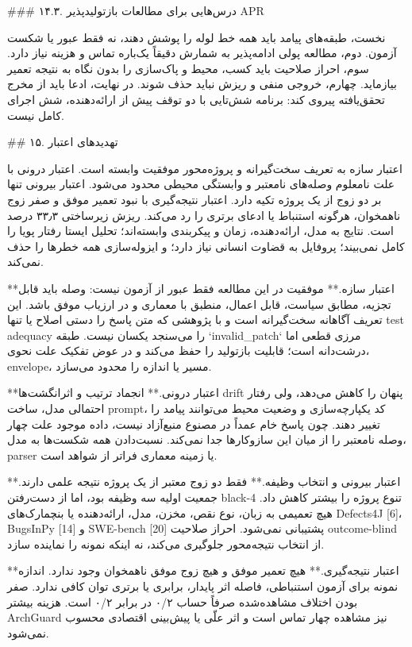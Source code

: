 \documentclass[11pt,a4paper]{article}
\begin{document}
\#\#\# ۱۴.۳. درس‌هایی برای مطالعات بازتولیدپذیر APR

نخست، طبقه‌های پیامد باید همه خط لوله را پوشش دهند، نه فقط عبور یا شکست آزمون. دوم، مطالعه پولی
ادامه‌پذیر به شمارش دقیقاً یک‌باره تماس و هزینه نیاز دارد. سوم، احراز صلاحیت باید کسب، محیط و پاک‌سازی
را بدون نگاه به نتیجه تعمیر بیازماید. چهارم، خروجی منفی و ریزش نباید حذف شوند. در نهایت، ادعا باید از
مخرج تحقق‌یافته پیروی کند: برنامه شش‌تایی با دو توقف پیش از ارائه‌دهنده، شش اجرای کامل نیست.

\#\# ۱۵. تهدیدهای اعتبار

اعتبار سازه به تعریف سخت‌گیرانه و پروژه‌محور موفقیت وابسته است. اعتبار درونی با علت نامعلوم وصله‌های
نامعتبر و وابستگی محیطی محدود می‌شود. اعتبار بیرونی تنها بر دو زوج از یک پروژه تکیه دارد. اعتبار
نتیجه‌گیری با نبود تعمیر موفق و صفر زوج ناهمخوان، هرگونه استنباط یا ادعای برتری را رد می‌کند. ریزش
زیرساختی ۳۳٫۳ درصد است. نتایج به مدل، ارائه‌دهنده، زمان و پیکربندی وابسته‌اند؛ تحلیل ایستا رفتار پویا
را کامل نمی‌بیند؛ پروفایل به قضاوت انسانی نیاز دارد؛ و ایزوله‌سازی همه خطرها را حذف نمی‌کند.

**اعتبار سازه.** موفقیت در این مطالعه فقط عبور از آزمون نیست: وصله باید قابل تجزیه، مطابق سیاست،
قابل اعمال، منطبق با معماری و در ارزیاب موفق باشد. این تعریف آگاهانه سخت‌گیرانه است و با پژوهشی که
متن پاسخ را دستی اصلاح یا تنها test adequacy را می‌سنجد یکسان نیست. طبقه `invalid_patch` مرزی قطعی
اما درشت‌دانه است؛ قابلیت بازتولید را حفظ می‌کند و در عوض تفکیک علت نحوی، envelope، مسیر یا اندازه را
محدود می‌سازد.

**اعتبار درونی.** انجماد ترتیب و اثرانگشت‌ها drift پنهان را کاهش می‌دهد، ولی رفتار احتمالی مدل، ساخت
prompt، کد یکپارچه‌سازی و وضعیت محیط می‌توانند پیامد را تغییر دهند. چون پاسخ خام عمداً در مصنوع
منبع‌آزاد نیست، داده موجود علت چهار وصله نامعتبر را از میان این سازوکارها جدا نمی‌کند. نسبت‌دادن همه
شکست‌ها به مدل، parser یا زمینه معماری فراتر از شواهد است.

**اعتبار بیرونی و انتخاب وظیفه.** فقط دو زوج معتبر از یک پروژه نتیجه علمی دارند. جمعیت اولیه سه وظیفه
بود، اما از دست‌رفتن black-4 تنوع پروژه را بیشتر کاهش داد. هیچ تعمیمی به زبان، نوع نقص، مخزن، مدل،
ارائه‌دهنده یا بنچمارک‌های Defects4J [6]، BugsInPy [14] و SWE-bench [20] پشتیبانی نمی‌شود. احراز
صلاحیت outcome-blind از انتخاب نتیجه‌محور جلوگیری می‌کند، نه اینکه نمونه را نماینده سازد.

**اعتبار نتیجه‌گیری.** هیچ تعمیر موفق و هیچ زوج موفق ناهمخوان وجود ندارد. اندازه نمونه برای آزمون
استنباطی، فاصله اثر پایدار، برابری یا برتری توان کافی ندارد. صفر بودن اختلاف مشاهده‌شده صرفاً حساب
۰/۲ در برابر ۰/۲ است. هزینه بیشتر ArchGuard نیز مشاهده چهار تماس است و اثر علّی یا پیش‌بینی اقتصادی
محسوب نمی‌شود.
\end{document}
